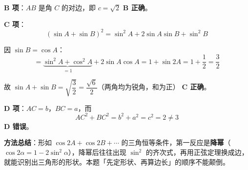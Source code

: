 \begin{answer}
\textbf{B 项}：$AB$ 是角 $C$ 的对边，即 $c=\sqrt2$  \textbf{B 正确}。

\textbf{C 项}：
\nopagebreak[4]
\[(\sin A+\sin B)^2=\sin^2A+2\sin A\sin B+\sin^2B\]

因 $\sin B=\cos A$：
\nopagebreak[4]
\[=\underbrace{\sin^2A+\cos^2A}_{=1}+2\sin A\cos A=1+\sin2A=1+\frac12=\frac32\]

故 $\sin A+\sin B=\sqrt{\dfrac32}=\dfrac{\sqrt6}{2}$（两角均为锐角，和为正） \textbf{C 正确}。

\textbf{D 项}：$AC=b$，$BC=a$，而
\nopagebreak[4]
\[AC^2+BC^2=b^2+a^2=c^2=2\ne3\]
 \textbf{D 错误}。

\begin{gktip}
\textbf{方法总结}：形如 $\cos2A+\cos2B+\cdots$ 的三角恒等条件，第一反应是\textbf{降幂}（$\cos2\alpha=1-2\sin^2\alpha$），降幂后往往出现 $\sin^2$ 的齐次式，再用正弦定理换成边，就能识别出三角形的形状。本题「先定形状、再算边长」的顺序不能颠倒。
\end{gktip}


\par\medskip

\end{answer}

